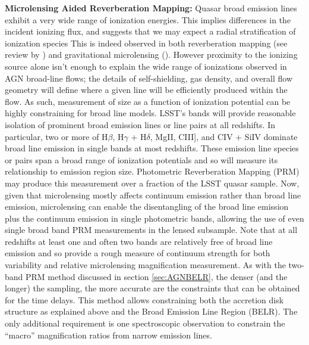 {\bf Microlensing Aided Reverberation Mapping:} Quasar broad emission lines exhibit a very wide range of ionization energies. This implies differences in the incident ionizing flux, and suggests that we may expect a radial stratification of ionization species This is indeed observed in both reverberation mapping (see review by \citealt{gaskell2009}) and gravitational microlensing (\citealt{guerras2013}). However proximity to the ionizing source alone isn't enough to explain the wide range of ionizations observed in AGN broad-line flows; the details of self-shielding, gas density, and overall flow geometry will define where a given line will be efficiently produced within the flow. As such, measurement of size as a function of ionization potential can be highly constraining for broad line models. LSST's bands will provide reasonable isolation of prominent broad emission lines or line pairs at all redshifts. In particular, two or more of H$\beta$, H$\gamma$ + H$\delta$, MgII, CIII], and CIV + SiIV dominate broad line emission in single bands at most redshifts. These emission line species or pairs span a broad range of ionization potentials and so will measure its relationship to emission region size. Photometric Reverberation Mapping (PRM) may produce this measurement over a fraction of the LSST quasar sample. Now, given that microlensing mostly affects continuum emission rather than  broad line emission, microlensing can enable the disentangling of the broad line emission plus the continuum emission in single photometric bands, allowing the use of even single broad band PRM measurements \citep{SluseandTewes2014} in the lensed subsample. Note that at all redshifts at least one and often two bands are relatively free of broad line emission and so provide a rough measure of continuum strength for both variability and relative microlensing magnification measurement. As with the two-band PRM method discussed in section \ref{sec:AGNBELR}, the
denser (and the longer) the sampling, the more accurate are the constraints that
can be obtained for the time delays. This method allows constraining both the
accretion disk structure as explained above and the Broad Emission Line Region (BELR). The only additional
requirement is one spectroscopic observation to constrain the ``macro''
magnification ratios from narrow emission lines.


